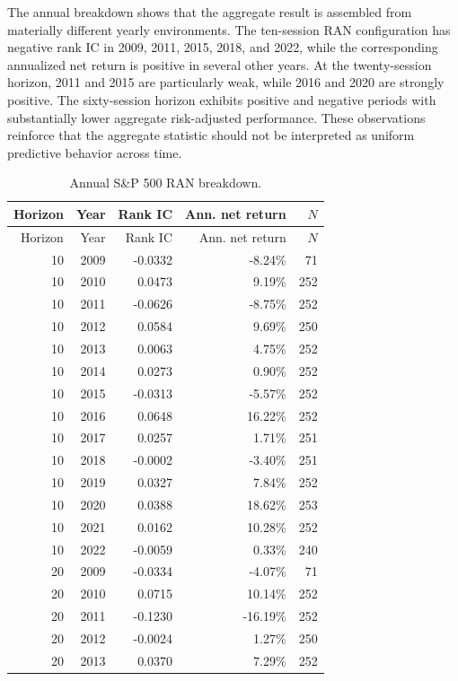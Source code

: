 \documentclass[10pt]{article}
\begin{document}
The annual breakdown shows that the aggregate result is assembled from materially different yearly environments. The ten-session RAN configuration has negative rank IC in 2009, 2011, 2015, 2018, and 2022, while the corresponding annualized net return is positive in several other years. At the twenty-session horizon, 2011 and 2015 are particularly weak, while 2016 and 2020 are strongly positive. The sixty-session horizon exhibits positive and negative periods with substantially lower aggregate risk-adjusted performance. These observations reinforce that the aggregate statistic should not be interpreted as uniform predictive behavior across time.

\begingroup\scriptsize\setlength{\tabcolsep}{3pt}
\begin{longtable}{rrr r r}
\caption{Annual S\&P 500 RAN breakdown.}\label{tab:sp500year}\\
\toprule
Horizon & Year & Rank IC & Ann. net return & $N$\\
\midrule
\endfirsthead
\toprule
Horizon & Year & Rank IC & Ann. net return & $N$\\
\midrule
\endhead
10 & 2009 & -0.0332 & -8.24\% & 71 \\
10 & 2010 & 0.0473 & 9.19\% & 252 \\
10 & 2011 & -0.0626 & -8.75\% & 252 \\
10 & 2012 & 0.0584 & 9.69\% & 250 \\
10 & 2013 & 0.0063 & 4.75\% & 252 \\
10 & 2014 & 0.0273 & 0.90\% & 252 \\
10 & 2015 & -0.0313 & -5.57\% & 252 \\
10 & 2016 & 0.0648 & 16.22\% & 252 \\
10 & 2017 & 0.0257 & 1.71\% & 251 \\
10 & 2018 & -0.0002 & -3.40\% & 251 \\
10 & 2019 & 0.0327 & 7.84\% & 252 \\
10 & 2020 & 0.0388 & 18.62\% & 253 \\
10 & 2021 & 0.0162 & 10.28\% & 252 \\
10 & 2022 & -0.0059 & 0.33\% & 240 \\
20 & 2009 & -0.0334 & -4.07\% & 71 \\
20 & 2010 & 0.0715 & 10.14\% & 252 \\
20 & 2011 & -0.1230 & -16.19\% & 252 \\
20 & 2012 & -0.0024 & 1.27\% & 250 \\
20 & 2013 & 0.0370 & 7.29\% & 252 \\

\end{longtable}
\end{document}
